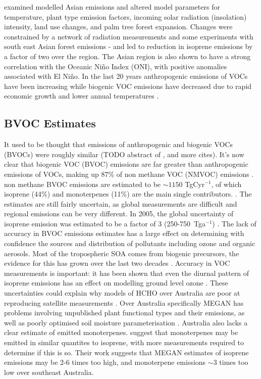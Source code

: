     \citet{Stavrakou2014} examined modelled Asian emissions and altered model parameters for temperature, plant type emission factors, incoming solar radiation (insolation) intensity, land use changes, and palm tree forest expansion.
    Changes were constrained by a network of radiation measurements and some experiments with south east Asian forest emissions - and led to reduction in isoprene emissions by a factor of two over the region.
    The Asian region is also shown to have a strong correlation with the Oceanic Niño Index (ONI), with positive anomalies associated with El Niño.
    In the last 20 years anthropogenic emissions of VOCs have been increasing while biogenic VOC emissions have decreased due to rapid economic growth and lower annual temperatures \citep{Stavrakou2014, Kwon2017}.
    
  \subsection{BVOC Estimates}
  \label{ch_LitRev:sec:BVOCestimates}
    It used to be thought that emissions of anthropogenic and biogenic VOCs (BVOCs) were roughly similar (TODO abstract of \citep{Mueller1992}, and more cites).
    It's now clear that biogenic VOC (BVOC) emissions are far greater than anthropogenic emissions of VOCs, making up 87\% of non methane VOC (NMVOC) emissions \citep{Kanikadou2005, Kefauver2014}.
    non methane BVOC emissions are estimated to be $\sim1150$ TgCyr$^{-1}$, of which isoprene (44\%) and monoterpenes (11\%) are the main single contributors. \citep{Guenther2000, Kefauver2014}. 
    The estimates are still fairly uncertain, as global measurements are difficult and regional emissions can be very different. 
    In 2005, %
    the global uncertainty of isoprene emission was estimated to be a factor of 3 (250-750~Tga$^{-1}$) \citep{Kanikadou2005}.
    The lack of accuracy in BVOC emissions estimates has a large effect on determining with confidence the sources and distribution of pollutants including ozone and organic aerosols.
    Most of the tropospheric SOA comes from biogenic precursors, the evidence for this has grown over the last two decades \citep{Guenther1995, Kanikadou2005,Guenther2012}.
    Accuracy in VOC measurements is important: it has been shown that even the diurnal pattern of isoprene emissions has an effect on modelling ground level ozone \citep{Hewitt2011,Fan2004}.
    These uncertainties could explain why models of HCHO over Australia are poor at reproducing satellite measurements \citep{Stavrakou2009}.
    Over Australia specifically MEGAN has problems involving unpublished plant functional types and their emissions, as well as poorly optimised soil moisture parameterisation \citep{Emmerson2016}.
    Australia also lacks a clear estimate of emitted monoterpenes.
    \cite{Emmerson2016} suggest that monoterpenes may be emitted in similar quantites to isoprene, with more measurements required to determine if this is so.
    Their work suggests that MEGAN estimates of isoprene emissions may be 2-6 times too high, and monoterpene emissions $\sim3$ times too low over southeast Australia.

